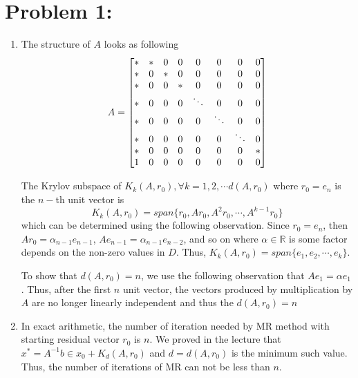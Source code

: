 \section*{Problem 1:}
\begin{enumerate}
\item The structure of $A$ looks as following 
$$
A = 
\setcounter{MaxMatrixCols}{11}
\begin{bmatrix}
* & * & 0 & 0 & 0 & 0 & 0 & 0\\
* & 0 & * & 0 & 0 & 0 & 0 & 0\\
* & 0 & 0 & * & 0 & 0 & 0 & 0\\
* & 0 & 0 & 0 & \ddots & 0 & 0 & 0\\
* & 0 & 0 & 0 & 0 & \ddots & 0 & 0\\
* & 0 & 0 & 0 & 0 & 0 & \ddots & 0\\
* & 0 & 0 & 0 & 0 & 0 & 0 & *\\
1 & 0 & 0 & 0 & 0 & 0 & 0 & 0\\
\end{bmatrix}
$$

The Krylov subspace of $K_{k}(A, r_{0}),  \forall k=1,2,\cdots d(A,r_{0})$ where $r_{0} = e_{n}$ is the $n-$th unit vector is 
$$
K_{k}(A, r_{0}) = span\{r_{0}, Ar_{0}, A^{2}r_{0}, \cdots, A^{k-1}r_{0} \}
$$
which can be determined using the following observation. Since $r_{0} = e_{n}$, then $Ar_{0} = \alpha_{n-1}e_{n-1}$, $Ae_{n-1} = \alpha_{n-1}e_{n-2}$, and so on where $\alpha \in \mathbb{R}$ is some factor depends on the non-zero values in $D$. Thus, $K_{k}(A,r_{0}) = span\{e_{1}, e_{2}, \cdots, e_{k}\}$.

To show that $d(A,r_{0}) = n$, we use the following observation that $Ae_{1} = \alpha e_{1}$. Thus, after the first $n$ unit vector, the vectors produced by multiplication by $A$ are no longer linearly independent and thus the $d(A, r_{0})=n$

\item In exact arithmetic, the number of iteration needed by MR method with starting residual vector $r_{0}$ is $n$. We proved in the lecture that $x^{*} = A^{-1}b \in x_{0}+ K_{d}(A,r_{0})$ and $d = d(A,r_{0})$ is the minimum such value. Thus, the number of iterations of MR can not be less than $n$. 


\end{enumerate}
